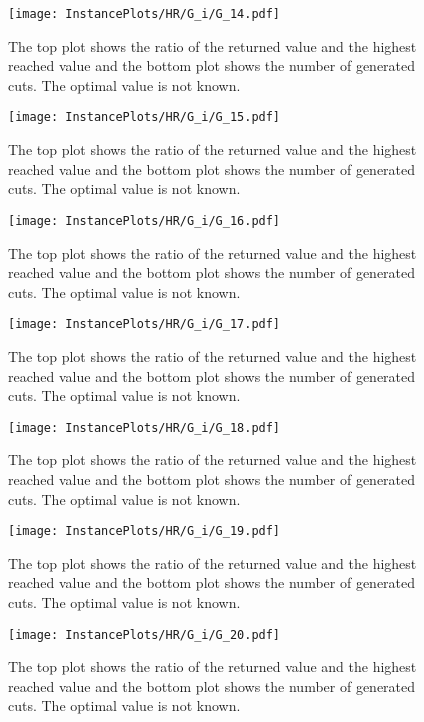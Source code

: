 \documentclass[10pt,a4paper]{article}
\begin{document}
\begin{figure}[H]
\texttt{[image: InstancePlots/HR/G\_i/G\_14.pdf]}
\caption{The top plot shows the ratio of the returned value and the highest reached value     and the bottom plot shows the number of generated cuts. The optimal value is not known.}
\end{figure}

\begin{figure}[H]
\texttt{[image: InstancePlots/HR/G\_i/G\_15.pdf]}
\caption{The top plot shows the ratio of the returned value and the highest reached value     and the bottom plot shows the number of generated cuts. The optimal value is not known.}
\end{figure}

\begin{figure}[H]
\texttt{[image: InstancePlots/HR/G\_i/G\_16.pdf]}
\caption{The top plot shows the ratio of the returned value and the highest reached value     and the bottom plot shows the number of generated cuts. The optimal value is not known.}
\end{figure}

\begin{figure}[H]
\texttt{[image: InstancePlots/HR/G\_i/G\_17.pdf]}
\caption{The top plot shows the ratio of the returned value and the highest reached value     and the bottom plot shows the number of generated cuts. The optimal value is not known.}
\end{figure}

\begin{figure}[H]
\texttt{[image: InstancePlots/HR/G\_i/G\_18.pdf]}
\caption{The top plot shows the ratio of the returned value and the highest reached value     and the bottom plot shows the number of generated cuts. The optimal value is not known.}
\end{figure}

\begin{figure}[H]
\texttt{[image: InstancePlots/HR/G\_i/G\_19.pdf]}
\caption{The top plot shows the ratio of the returned value and the highest reached value     and the bottom plot shows the number of generated cuts. The optimal value is not known.}
\end{figure}

\begin{figure}[H]
\texttt{[image: InstancePlots/HR/G\_i/G\_20.pdf]}
\caption{The top plot shows the ratio of the returned value and the highest reached value     and the bottom plot shows the number of generated cuts. The optimal value is not known.}
\end{figure}
\end{document}
